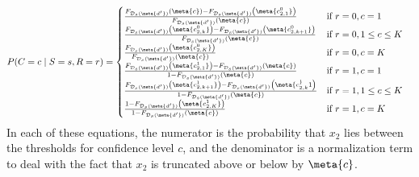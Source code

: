 \begin{align*}
    P(C=c \;\vert\; S=s,R=r) &= \begin{cases}
    \frac{F_{\mathcal{D}_s(\meta{d'})}\left(\meta{c}\right) -
    F_{\mathcal{D}_s(\meta{d'})}\left(\meta{c_{2,1}^0}\right)}
    {F_{\mathcal{D}_s(\meta{d'})}\left(\meta{c}\right)}
    & \textrm{if } r=0, c=1 \\
    \frac{F_{\mathcal{D}_s(\meta{d'})}\left(\meta{c_{2,k}^0}\right) -
    F_{\mathcal{D}_s(\meta{d'})}\left(\meta{c_{2,k+1}^0}\right)}
    {F_{\mathcal{D}_s(\meta{d'})}\left(\meta{c}\right)}
    & \textrm{if } r=0, 1 \le c \le K \\
    \frac{F_{\mathcal{D}_s(\meta{d'})}\left(\meta{c_{2,K}^0}\right)}
    {F_{\mathcal{D}_s(\meta{d'})}\left(\meta{c}\right)}
    & \textrm{if } r=0, c = K \\
    \frac{F_{\mathcal{D}_s(\meta{d'})}\left(\meta{c_{2,1}^1}\right) -
    F_{\mathcal{D}_s(\meta{d'})}\left(\meta{c}\right)}
    {1 - F_{\mathcal{D}_s(\meta{d'})}\left(\meta{c}\right)}
    & \textrm{if } r=1, c=1 \\
    \frac{F_{\mathcal{D}_s(\meta{d'})}\left(\meta{c_{2,k+1}^1}\right) -
    F_{\mathcal{D}_s(\meta{d'})}\left(\meta{c_{2,k}^}1\right)}
    {1 - F_{\mathcal{D}_s(\meta{d'})}\left(\meta{c}\right)}
    & \textrm{if } r=1, 1 \le c \le K \\
    \frac{1 - F_{\mathcal{D}_s(\meta{d'})}\left(\meta{c_{2,K}^1}\right)}
    {1 - F_{\mathcal{D}_s(\meta{d'})}\left(\meta{c}\right)}
    & \textrm{if } r=1, c = K
    \end{cases}
\end{align*}
In each of these equations, the numerator is the probability that $x_2$ lies between the thresholds for confidence level $c$, and the denominator is a normalization term to deal with the fact that $x_2$ is truncated above or below by $\meta{c}$.

